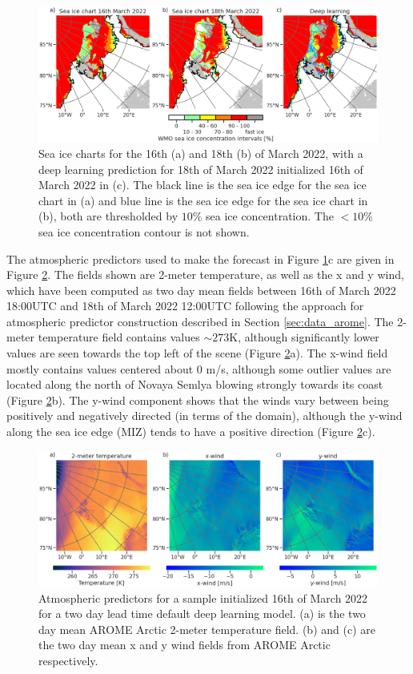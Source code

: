 \documentclass[../main/thesis.tex]{subfiles}
\begin{document}
\begin{figure}
    \centering
    \includegraphics[width=\textwidth]{predictions}
    \caption{\label{fig:case_preds}Sea ice charts for the 16th (a) and 18th (b) of March 2022, with a deep learning prediction for 18th of March 2022 initialized 16th of March 2022 in (c). The black line is the sea ice edge for the sea ice chart in (a) and blue line is the sea ice edge for the sea ice chart in (b), both are thresholded by $10\%$ sea ice concentration. The $<10\%$ sea ice concentration contour is not shown.}
\end{figure}

The atmospheric predictors used to make the forecast in Figure \ref{fig:case_preds}c are given in Figure \ref{fig:case_atmos}. The fields shown are 2-meter temperature, as well as the x and y wind, which have been computed as two day mean fields between 16th of March 2022 18:00UTC and 18th of March 2022 12:00UTC following the approach for atmospheric predictor construction described in Section \ref{sec:data_arome}. The 2-meter temperature field contains values $\sim 273$K, although significantly lower values are seen towards the top left of the scene (Figure \ref{fig:case_atmos}a). The x-wind field mostly contains values centered about 0 m/s, although some outlier values are located along the north of Novaya Semlya blowing strongly towards its coast (Figure \ref{fig:case_atmos}b). The y-wind component shows that the winds vary between being positively and negatively directed (in terms of the domain), although the y-wind along the sea ice edge (MIZ) tends to have a positive direction (Figure \ref{fig:case_atmos}c).

\begin{figure}
    \centering
    \includegraphics[width=\textwidth]{atmosphere}
    \caption{\label{fig:case_atmos}Atmospheric predictors for a sample initialized 16th of March 2022 for a two day lead time default deep learning model. (a) is the two day mean AROME Arctic 2-meter temperature field. (b) and (c) are the two day mean x and y wind fields from AROME Arctic respectively.}
\end{figure}
\end{document}
